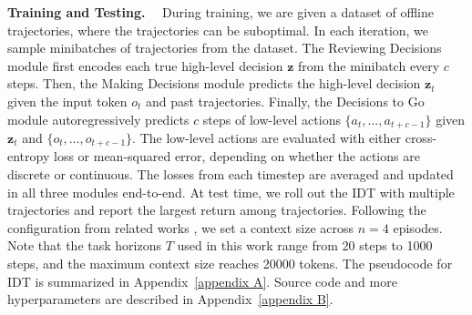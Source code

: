 \noindent\textbf{Training and Testing.}~~
During training, we are given a dataset of offline trajectories, where the trajectories can be suboptimal.
In each iteration, we sample minibatches of trajectories from the dataset. 
The Reviewing Decisions module first encodes each true high-level decision $\textbf{z}$ from the minibatch every $c$ steps.
Then, the Making Decisions module predicts the high-level decision $\textbf{z}_t$ given the input token $o_t$ and past trajectories. Finally, the Decisions to Go module autoregressively predicts $c$ steps of low-level actions $\{a_t,\dots,a_{t+c-1}\}$ given $\textbf{z}_t$ and $\{o_t,\dots,o_{t+c-1}\}$. The low-level actions are evaluated with either cross-entropy loss or mean-squared error, depending on whether the actions are discrete or continuous. The losses from each timestep are averaged and updated in all three modules end-to-end. At test time, we roll out the IDT with multiple trajectories and report the largest return among trajectories. Following the configuration from related works \citet{1,8}, we set a context size across $n=4$ episodes.
Note that the task horizons $T$ used in this work range from 20 steps to 1000 steps, and the maximum context size reaches 20000 tokens.
The pseudocode for IDT is summarized in Appendix~\ref{appendix A}. Source code and more hyperparameters are described in Appendix~\ref{appendix B}.
